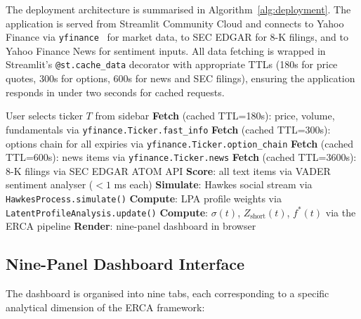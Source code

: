 \documentclass[10pt,twocolumn]{article}
\newcommand{\Zshort}{Z_{\mathrm{short}}}
\begin{document}
The deployment architecture is summarised in Algorithm~\ref{alg:deployment}.
The application is served from Streamlit Community Cloud and connects to
Yahoo Finance via \texttt{yfinance}~\cite{yfinance2024} for market data,
to SEC EDGAR for 8-K filings, and to Yahoo Finance News for sentiment inputs.
All data fetching is wrapped in Streamlit's \texttt{@st.cache\_data}
decorator with appropriate TTLs (180s for price quotes, 300s for options,
600s for news and SEC filings), ensuring the application responds in under
two seconds for cached requests.

\begin{algorithm}[htbp]
\caption{ERCA Web Deployment --- Data Flow}
\label{alg:deployment}
\begin{algorithmic}[1]
\small
\State User selects ticker $T$ from sidebar
\State \textbf{Fetch} (cached TTL=180s): price, volume, fundamentals via \texttt{yfinance.Ticker.fast\_info}
\State \textbf{Fetch} (cached TTL=300s): options chain for all expiries via \texttt{yfinance.Ticker.option\_chain}
\State \textbf{Fetch} (cached TTL=600s): news items via \texttt{yfinance.Ticker.news}
\State \textbf{Fetch} (cached TTL=3600s): 8-K filings via SEC EDGAR ATOM API
\State \textbf{Score}: all text items via VADER sentiment analyser ($<1$ ms each)
\State \textbf{Simulate}: Hawkes social stream via \texttt{HawkesProcess.simulate()}
\State \textbf{Compute}: LPA profile weights via \texttt{LatentProfileAnalysis.update()}
\State \textbf{Compute}: $\sigma(t)$, $\Zshort(t)$, $f^*(t)$ via the ERCA pipeline
\State \textbf{Render}: nine-panel dashboard in browser
\end{algorithmic}
\end{algorithm}

\subsection{Nine-Panel Dashboard Interface}

The dashboard is organised into nine tabs, each corresponding to a specific
analytical dimension of the ERCA framework:
\end{document}
